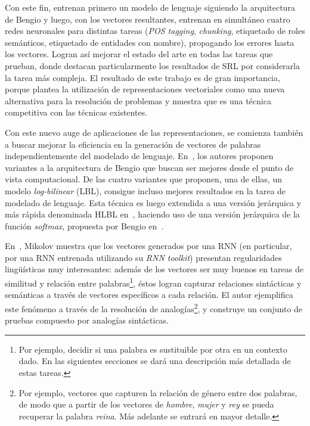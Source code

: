 Con este fin, entrenan primero un modelo de lenguaje siguiendo la arquitectura de Bengio y luego,
con los vectores resultantes, entrenan en simultáneo cuatro redes neuronales para distintas tareas
(\textit{POS tagging}, \textit{chunking}, etiquetado de roles semánticos, etiquetado de entidades
con nombre), propagando los errores hasta los vectores. Logran así mejorar el estado del arte en
todas las tareas que prueban, donde destacan particularmente los resultados de SRL por considerarla
la tarea más compleja. El resultado de este trabajo es de gran importancia, porque plantea la
utilización de representaciones vectoriales como una nueva alternativa para la resolución de
problemas y muestra que es una técnica competitiva con las técnicas existentes.


Con este nuevo auge de aplicaciones de las representaciones, se comienza también a buscar mejorar
la eficiencia en la generación de vectores de palabras independientemente del modelado de
lenguaje. En~\cite{MnihHinton2007}, los autores proponen variantes a la arquitectura de Bengio que
buscan ser mejores desde el punto de vista computacional. De las cuatro variantes que proponen, una
de ellas, un modelo \textit{log-bilinear} (LBL), consigue incluso mejores resultados en la tarea de
modelado de lenguaje. Esta técnica es luego extendida a una versión jerárquica y más rápida
denominada HLBL en~\cite{MnihHinton2009}, haciendo uso de una versión jerárquica de la función
\textit{softmax}, propuesta por Bengio en~\cite{MorinBengio2005}.


En~\cite{Mikolov2013a}, Mikolov muestra que los vectores generados por una RNN (en particular, por
una RNN entrenada utilizando su \textit{RNN toolkit}) presentan regularidades lingüísticas muy
interesantes: además de los vectores ser muy buenos en tareas de similitud y relación entre
palabras\footnote{Por ejemplo, decidir si una palabra es sustituible por otra en un contexto
dado. En las siguientes secciones se dará una descripción más detallada de estas tareas.}, éstos
logran capturar relaciones sintácticas y semánticas a través de vectores específicos a cada
relación. El autor ejemplifica este fenómeno a través de la resolución de analogías\footnote{Por
ejemplo, vectores que capturen la relación de género entre dos palabras, de modo que a partir de los
vectores de \textit{hombre}, \textit{mujer} y \textit{rey} se pueda recuperar la palabra
\textit{reina}. Más adelante se entrará en mayor detalle.}, y construye un conjunto de pruebas
compuesto por analogías sintácticas.

